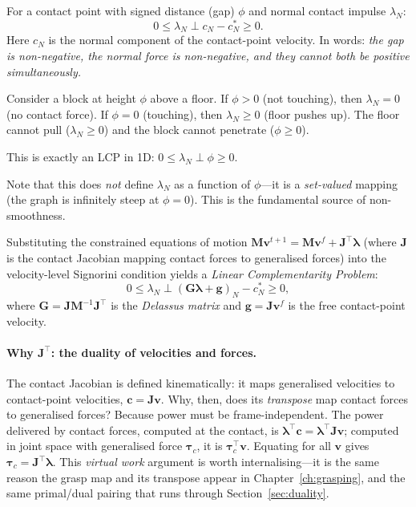 \documentclass[11pt,twoside]{report}
\theoremstyle{definition}
\theoremstyle{plain}
\theoremstyle{remark}
\newcommand{\0}{\bm{0}}
\newcommand{\M}{\bm{M}}
\newcommand{\J}{\bm{J}}
\begin{document}
\begin{definitionbox}
For a contact point with signed distance (gap) $\phi$ and normal
contact impulse $\lambda_{N}$:
\begin{equation}\label{eq:signorini}
\boxed{
0\le\lambda_{N}\perp c_{N}-c_{N}^{*}\ge 0.
}
\end{equation}
Here $c_{N}$ is the normal component of the contact-point velocity.
In words: \emph{the gap is non-negative, the normal force is non-negative,
and they cannot both be positive simultaneously.}
\end{definitionbox}

\begin{examplebox}
Consider a block at height $\phi$ above a floor.
If $\phi>0$ (not touching), then $\lambda_{N}=0$ (no contact force).
If $\phi=0$ (touching), then $\lambda_{N}\ge 0$ (floor pushes up).
The floor cannot pull ($\lambda_{N}\ge 0$) and the block cannot penetrate ($\phi\ge 0$).

This is exactly an LCP in 1D:
$0\le\lambda_{N}\perp\phi\ge 0$.

Note that this does \emph{not} define $\lambda_{N}$ as a function of $\phi$---it is a \emph{set-valued} mapping (the graph is infinitely steep at $\phi=0$).
This is the fundamental source of non-smoothness.
\end{examplebox}

Substituting the constrained equations of motion
$\M\bm{v}^{t+1}=\M\bm{v}^{f}+\J^{\!\top}\bm{\lambda}$
(where $\J$ is the contact Jacobian mapping contact forces to
generalised forces) into the velocity-level Signorini condition yields
a \emph{Linear Complementarity Problem}:
\begin{equation}\label{eq:lcp-contact}
0\le\lambda_{N}\perp(\bm{G}\bm{\lambda}+\bm{g})_{N}-c_{N}^{*}\ge 0,
\end{equation}
where $\bm{G}=\J\M^{-1}\J^{\!\top}$ is the \emph{Delassus matrix}
and $\bm{g}=\J\bm{v}^{f}$ is the free contact-point velocity.

\paragraph{Why $\J^{\!\top}$: the duality of velocities and forces.}
The contact Jacobian is defined kinematically: it maps generalised
velocities to contact-point velocities, $\bm{c}=\J\bm{v}$.
Why, then, does its \emph{transpose} map contact forces to generalised
forces? Because power must be frame-independent. The power delivered by
contact forces, computed at the contact, is
$\bm{\lambda}^{\!\top}\bm{c}=\bm{\lambda}^{\!\top}\J\bm{v}$;
computed in joint space with generalised force $\bm{\tau}_{c}$, it is
$\bm{\tau}_{c}^{\!\top}\bm{v}$. Equating for all $\bm{v}$ gives
$\bm{\tau}_{c}=\J^{\!\top}\bm{\lambda}$. This \emph{virtual work}
argument is worth internalising---it is the same reason the grasp map
and its transpose appear in Chapter~\ref{ch:grasping}, and the same
primal/dual pairing that runs through Section~\ref{sec:duality}.
\end{document}
